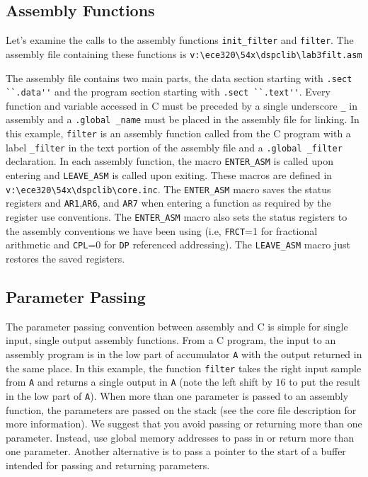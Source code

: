 \subsection{Assembly Functions}
Let's examine the calls to the assembly functions \verb+init_filter+ and 
\verb+filter+.  The assembly file containing these functions is 
\verb+v:\ece320\54x\dspclib\lab3filt.asm+

\setlength{\baselineskip}{0.39cm}
\setlength{\parskip}{0.4cm}
\setlength{\baselineskip}{0.5cm}
\setlength{\parskip}{0.5cm}

The assembly file contains two main parts, the data section starting 
with \verb+.sect ``.data''+ and the program section starting with 
\verb+.sect ``.text''+.  Every function and variable accessed in C must be 
preceded by a single underscore \verb+_+ in assembly and 
a \verb+.global _name+ must be placed in the assembly file for linking.  
In this example, \verb+filter+ is an assembly function called from 
the C program with a label \verb+_filter+ in the text portion of the 
assembly file and a \verb+.global _filter+ declaration.  
In each assembly function, the macro \verb+ENTER_ASM+ is called upon 
entering and \verb+LEAVE_ASM+ is called upon exiting.  These 
macros are defined in \verb+v:\ece320\54x\dspclib\core.inc+.  The 
\verb+ENTER_ASM+ macro saves the status registers and 
\verb+AR1+,\verb+AR6+, and \verb+AR7+ when entering a function as 
required by the register use conventions.  The \verb+ENTER_ASM+ macro
also sets the status registers to the assembly conventions we 
have been using (i.e, \verb+FRCT+=1 for fractional arithmetic and 
\verb+CPL+=0 for \verb+DP+ referenced addressing).  
The \verb+LEAVE_ASM+ macro just restores the saved registers.

\subsection{Parameter Passing}
\label{sec:parameter passing}
The parameter passing convention between assembly and C is 
simple for single input, single output assembly functions.  From a 
C program, the input to an assembly program is in the low part of 
accumulator \verb+A+ with the output returned in the same place.  
In this example, the function \verb+filter+ takes the 
right input sample from \verb+A+ and returns a single output in 
\verb+A+ (note the left shift by $16$ to put the result in the low part of 
\verb+A+).  When more than one parameter is passed to an assembly function, 
the parameters are passed on the stack 
(see the core file description for more information).  We suggest that you 
avoid passing or returning more than one parameter.  Instead, use global 
memory addresses to pass in or return more than one parameter.  
Another alternative is to pass a pointer to the start of a buffer intended 
for passing and returning parameters.

